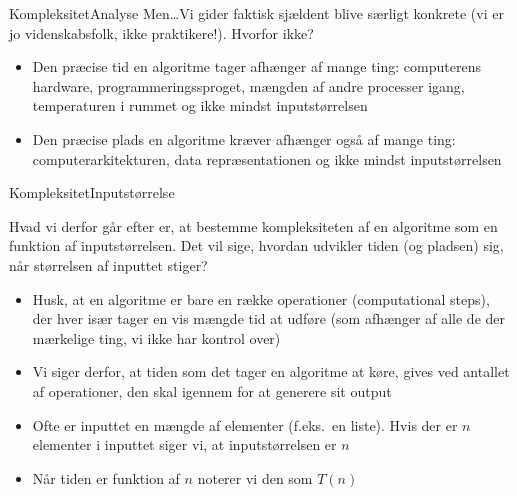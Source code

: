 \documentclass{beamer}
\begin{document}
\begin{frame}{Kompleksitet}{Analyse}
    Men\ldots Vi gider faktisk sjældent blive særligt konkrete (vi er jo
    videnskabsfolk, ikke praktikere!). Hvorfor ikke?

    \pause
    \begin{itemize}
        \item Den præcise tid en algoritme tager afhænger af mange ting:
            computerens hardware, programmeringssproget, mængden af andre
            processer igang, temperaturen i rummet og ikke mindst
            \alert{inputstørrelsen}
        \item Den præcise plads en algoritme kræver afhænger også af mange ting:
            computerarkitekturen, data repræsentationen og ikke mindst
            \alert{inputstørrelsen}
    \end{itemize}
\end{frame}

\begin{frame}{Kompleksitet}{Inputstørrelse}

    Hvad vi derfor går efter er, at bestemme kompleksiteten af en algoritme som
    \alert{en funktion af inputstørrelsen}. Det vil sige, hvordan udvikler tiden
    (og pladsen) sig, når størrelsen af inputtet stiger?

    \pause
    \begin{itemize}
        \item Husk, at en algoritme er bare en række \alert{operationer}
            (computational steps), der hver især tager en vis mængde tid at
            udføre (som afhænger af alle de der mærkelige ting, vi ikke har
            kontrol over)
        \item Vi siger derfor, at tiden som det tager en algoritme at køre,
            gives ved \alert{antallet af operationer}, den skal igennem for at
            generere sit output
        \item Ofte er inputtet en mængde af elementer (f.eks.\ en liste). Hvis
            der er $n$ elementer i inputtet siger vi, at inputstørrelsen er
            \alert{$n$}
        \item Når tiden er funktion af $n$ noterer vi den som $T(n)$
    \end{itemize}

\end{frame}
\end{document}
